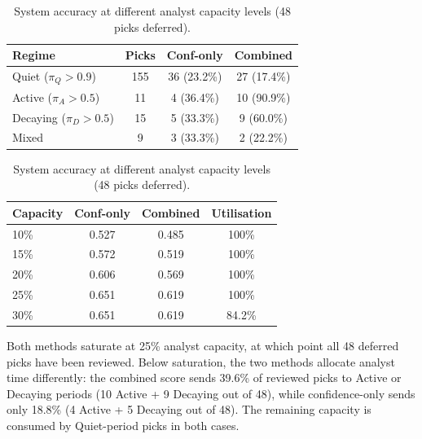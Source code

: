\begin{table}[t]
    \centering
    \begin{minipage}[t]{0.48\textwidth}
        \centering
        \caption{Regime-stratified deferral rates at 25\% overall deferral.}
        \label{tab:regime_deferral_detail}
        \small
        \begin{tabular}{@{}lccc@{}}
            \toprule
            Regime & Picks & Conf-only & Combined \\
            \midrule
            Quiet ($\pi_Q > 0.9$) & 155 & 36 (23.2\%) & 27 (17.4\%) \\
            Active ($\pi_A > 0.5$) & 11 & 4 (36.4\%) & 10 (90.9\%) \\
            Decaying ($\pi_D > 0.5$) & 15 & 5 (33.3\%) & 9 (60.0\%) \\
            Mixed & 9 & 3 (33.3\%) & 2 (22.2\%) \\
            \bottomrule
        \end{tabular}
    \end{minipage}
    \hfill
    \begin{minipage}[t]{0.48\textwidth}
        \centering
        \caption{System accuracy at different analyst capacity levels (48 picks deferred).}
        \label{tab:capacity}
        \small
        \begin{tabular}{@{}lccc@{}}
            \toprule
            Capacity & Conf-only & Combined & Utilisation \\
            \midrule
            10\% & 0.527 & 0.485 & 100\% \\
            15\% & 0.572 & 0.519 & 100\% \\
            20\% & 0.606 & 0.569 & 100\% \\
            25\% & 0.651 & 0.619 & 100\% \\
            30\% & 0.651 & 0.619 & 84.2\% \\
            \bottomrule
        \end{tabular}
    \end{minipage}
\end{table}

Both methods saturate at 25\% analyst capacity, at which point all 48 deferred picks have been reviewed. Below saturation, the two methods allocate analyst time differently: the combined score sends 39.6\% of reviewed picks to Active or Decaying periods (10 Active + 9 Decaying out of 48), while confidence-only sends only 18.8\% (4 Active + 5 Decaying out of 48). The remaining capacity is consumed by Quiet-period picks in both cases.

